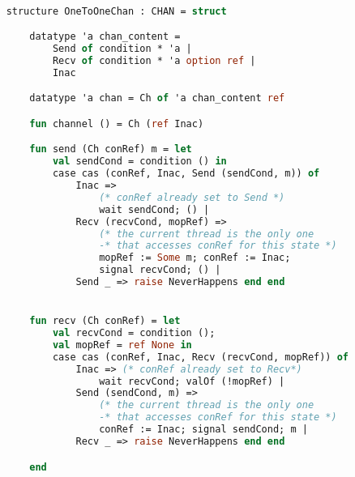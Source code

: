 \documentclass{article}
\begin{document}
    \begin{lstlisting}[language=ML, style=codestyle1]

    structure OneToOneChan : CHAN = struct

        datatype 'a chan_content =
            Send of condition * 'a |
            Recv of condition * 'a option ref |
            Inac  

        datatype 'a chan = Ch of 'a chan_content ref

        fun channel () = Ch (ref Inac)

        fun send (Ch conRef) m = let
            val sendCond = condition () in
            case cas (conRef, Inac, Send (sendCond, m)) of
                Inac => 
                    (* conRef already set to Send *)
                    wait sendCond; () |
                Recv (recvCond, mopRef) =>
                    (* the current thread is the only one
                    -* that accesses conRef for this state *)
                    mopRef := Some m; conRef := Inac;
                    signal recvCond; () |
                Send _ => raise NeverHappens end end


        fun recv (Ch conRef) = let
            val recvCond = condition ();
            val mopRef = ref None in
            case cas (conRef, Inac, Recv (recvCond, mopRef)) of
                Inac => (* conRef already set to Recv*)
                    wait recvCond; valOf (!mopRef) |
                Send (sendCond, m) =>
                    (* the current thread is the only one
                    -* that accesses conRef for this state *)
                    conRef := Inac; signal sendCond; m |
                Recv _ => raise NeverHappens end end 

        end
    \end{lstlisting}
\end{document}
